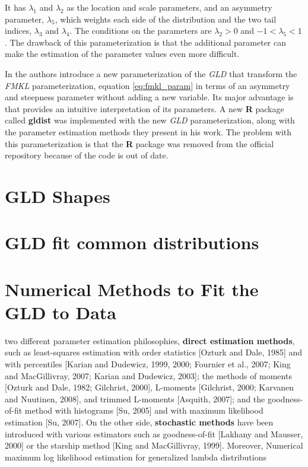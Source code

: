 It has $\lambda_{1}$ and $\lambda_{2}$ as the location and scale parameters, and an asymmetry parameter, $\lambda_{5}$, which weights each side of the distribution and the two tail indices, $\lambda_{3}$ and $\lambda_{4}$. The conditions on the parameters are $\lambda_{2} > 0$ and $-1 < \lambda_{5} < 1$. The drawback of this parameterization is that the additional parameter can make the estimation of the parameter values even more difficult.

In \cite{Chalabi2012} the authors introduce a new parameterization of the \textit{GLD} that transform the \textit{FMKL} parameterization, equation \ref{eq:fmkl_param} in terms of an asymmetry and steepness parameter without adding a new variable. Its major advantage is that provides an intuitive interpretation of its parameters. A new \textbf{R} package called \textbf{gldist} was implemented with the new \textit{GLD} parameterization, along with the parameter estimation methods they present in his work. The problem with this parameterization is  that the \textbf{R} package was removed from the official repository because of the code is out of date.

\cite{Lodziensis2013}


\section{GLD Shapes}

\section{GLD fit common distributions}\label{sec:gld_fit_other}

\section{Numerical Methods to Fit the GLD to Data}
two different parameter estimation philosophies, 
\textbf{direct estimation methods}, such as least-squares estimation with order statistics [Ozturk and Dale, 1985] and with percentiles [Karian and Dudewicz, 1999, 2000; Fournier et al., 2007; King and MacGillivray, 2007; Karian and Dudewicz, 2003]; the methods of moments [Ozturk and Dale, 1982; Gilchrist, 2000], L-moments [Gilchrist, 2000; Karvanen and Nuutinen, 2008], and trimmed L-moments [Asquith, 2007]; and the goodness-of-fit method with histograms [Su, 2005] and with maximum likelihood estimation [Su, 2007]. On the other side, \textbf{stochastic methods} have been introduced with various estimators such as goodness-of-fit [Lakhany and Mausser, 2000] or the starship method [King and MacGillivray, 1999]. Moreover,
\cite{Lampasi2006}
Numerical maximum log likelihood estimation for generalized lambda distributions
\cite{Lakhany2000}
\cite{Fournier2007}
\cite{Marcondes2018}

